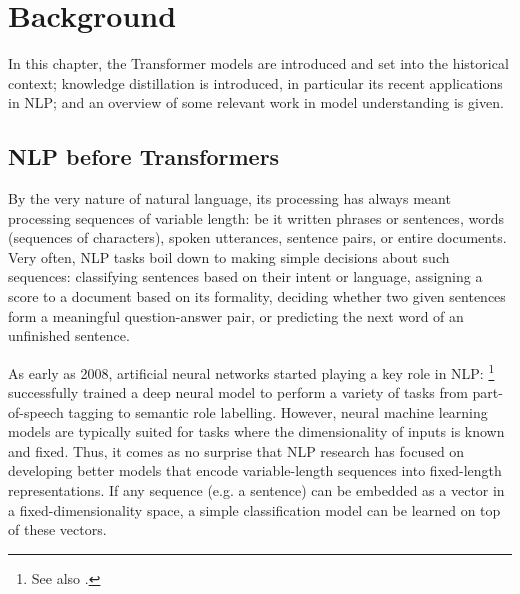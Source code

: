 \documentclass[bsc,frontabs,singlespacing,parskip,deptreport]{infthesis}
\begin{document}
\chapter{Background}{
  \label{ch:background}

  In this chapter, the Transformer models are introduced and set into the historical context; knowledge distillation is introduced, in particular its recent applications in NLP; and an overview of some relevant work in model understanding is given.

  \section{NLP before Transformers}{
    \label{sec:pre-transformer-nlp}
    By the very nature of natural language, its processing has always meant processing sequences of variable length: be it written phrases or sentences, words (sequences of characters), spoken utterances, sentence pairs, or entire documents.
    Very often, NLP tasks boil down to making simple decisions about such sequences: classifying sentences based on their intent or language, assigning a score to a document based on its formality, deciding whether two given sentences form a meaningful question-answer pair, or predicting the next word of an unfinished sentence.

    As early as 2008, artificial neural networks started playing a key role in NLP: \citet{Collobert_Weston_2008}\footnote{See also \citet{Collobert_Weston_2011}.} successfully trained a deep neural model to perform a variety of tasks from part-of-speech tagging to semantic role labelling.
    However, neural machine learning models are typically suited for tasks where the dimensionality of inputs is known and fixed. Thus, it comes as no surprise that NLP research has focused on developing better models that encode variable-length sequences into fixed-length representations. 
    If any sequence (e.g. a sentence) can be embedded as a vector in a fixed-dimensionality space, a simple classification model can be learned on top of these vectors.
    
}}
\end{document}
